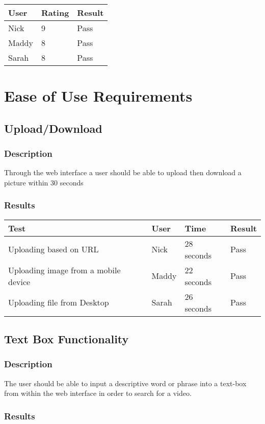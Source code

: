 \documentclass{scrreprt}
\begin{document}
 \centering
 \begin{tabular}{||p{2.5cm}|p{2.5cm}|p{2.5cm}||}
 \hline
 \bf User & \bf Rating & \bf Result\\
 \hline\hline
 Nick & 9 & Pass \\
 \hline
 Maddy & 8 & Pass\\ %
 \hline
 Sarah & 8 & Pass \\
 \hline
 \end{tabular}

\section{Ease of Use Requirements}

\subsection{Upload/Download}
\subsubsection{Description}
\begin{flushleft}
Through the web interface a user should be able to upload then download a picture within 30 seconds
\subsubsection{Results}
\end{flushleft}

 \centering
 \begin{tabular}{||p{4.5cm}|p{2.5cm}|p{2.5cm}|p{2.5cm}||}
 \hline
 \bf Test & \bf User & \bf Time & \bf Result \\
 \hline\hline
    Uploading based on URL & Nick & 28 seconds & Pass\\
 \hline\hline
    Uploading image from a mobile device & Maddy & 22 seconds  & Pass\\
 \hline\hline
    Uploading file from Desktop &  Sarah & 26 seconds & Pass\\
 \hline
 \end{tabular}
 
\subsection{Text Box Functionality}
\subsubsection{Description}
\begin{flushleft}
The user should be able to input a descriptive word or phrase into a text-box from within the web interface in order to search for a video.
\subsubsection{Results}
\end{flushleft}
\end{document}
